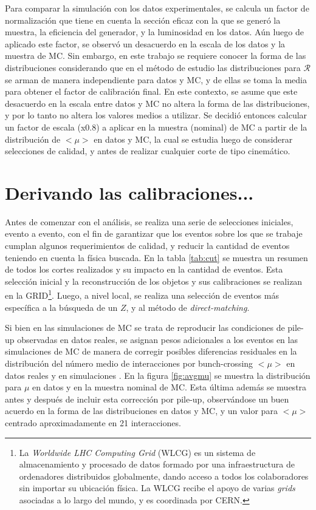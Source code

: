 Para comparar la simulación con los datos experimentales, se calcula un factor de normalización que tiene en cuenta la sección eficaz con la que se generó la muestra, la eficiencia del generador, y la luminosidad en los datos. Aún luego de aplicado este factor, se observó un desacuerdo en la escala de los datos y la muestra de MC. Sin embargo, en este trabajo se requiere conocer la forma de las distribuciones considerando que en el método de estudio las distribuciones para $\mathcal{R}$ se arman de manera independiente para datos y MC, y de ellas se toma la media para obtener el factor de calibración final. En este contexto, se asume que este desacuerdo en la escala entre datos y MC no altera la forma de las distribuciones, y por lo tanto no altera los valores medios a utilizar. Se decidió entonces calcular un factor de escala (x0.8) a aplicar en la muestra (nominal) de MC a partir de la distribución de $<\mu>$ en datos y MC, la cual se estudia luego de considerar selecciones de calidad, y antes de realizar cualquier corte de tipo cinemático. 

\section{Derivando las calibraciones...}\label{Derivandow}

Antes de comenzar con el análisis, se realiza una serie de selecciones iniciales, evento a evento, con el fin de garantizar que los eventos sobre los que se trabaje cumplan algunos requerimientos de calidad, y reducir la cantidad de eventos teniendo en cuenta la física buscada. En la tabla \ref{tab:cut} se muestra un resumen de todos los cortes realizados y su impacto en la cantidad de eventos. Esta selección inicial y la reconstrucción de los objetos y sus calibraciones se realizan en la GRID\footnote{La \textit{Worldwide LHC Computing Grid} (WLCG) es un sistema de almacenamiento y procesado de datos formado por una infraestructura de ordenadores distribuidos globalmente, dando acceso a todos los colaboradores sin importar su ubicación física. La WLCG recibe el apoyo de varias \textit{grids} asociadas a lo largo del mundo, y es coordinada por CERN.}. Luego, a nivel local, se realiza una selección de eventos más específica a la búsqueda de un $Z$, y al método de \textit{direct-matching}. 

Si bien en las simulaciones de MC se trata de reproducir las condiciones de pile-up observadas en datos reales, se asignan pesos adicionales a los eventos en las simulaciones de MC de manera de corregir posibles diferencias residuales en la distribución del número medio de interacciones por bunch-crossing $<\mu>$ en datos reales y en simulaciones \cite{PRW}. En la figura \ref{fig:avgmu} se muestra la distribución para $\mu$ en datos y en la muestra nominal de MC. Esta última además se muestra antes y después de incluir esta corrección por pile-up, observándose un buen acuerdo en la forma de las distribuciones en datos y MC, y un valor para $<\mu>$ centrado aproximadamente en 21 interacciones.


